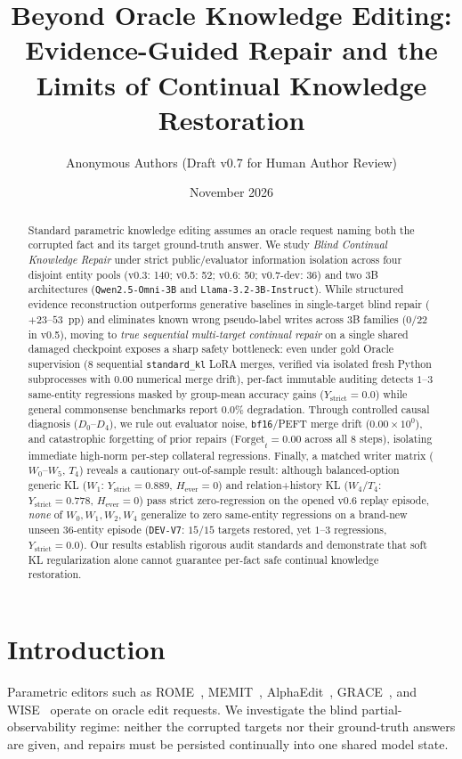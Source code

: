 \documentclass[11pt]{article}
\title{Beyond Oracle Knowledge Editing: Evidence-Guided Repair and the Limits of Continual Knowledge Restoration}
\author{Anonymous Authors (Draft v0.7 for Human Author Review)}
\date{November 2026}
\begin{document}
\maketitle

\begin{abstract}
Standard parametric knowledge editing assumes an oracle request naming both the corrupted fact and its target ground-truth answer. We study \emph{Blind Continual Knowledge Repair} under strict public/evaluator information isolation across four disjoint entity pools (v0.3: 140; v0.5: 52; v0.6: 50; v0.7-dev: 36) and two 3B architectures (\texttt{Qwen2.5-Omni-3B} and \texttt{Llama-3.2-3B-Instruct}). While structured evidence reconstruction outperforms generative baselines in single-target blind repair ($+23$--$53$~pp) and eliminates known wrong pseudo-label writes across 3B families ($0/22$ in v0.5), moving to \emph{true sequential multi-target continual repair} on a single shared damaged checkpoint exposes a sharp safety bottleneck: even under gold Oracle supervision ($8$ sequential \texttt{standard\_kl} LoRA merges, verified via isolated fresh Python subprocesses with $0.00$ numerical merge drift), per-fact immutable auditing detects $1$--$3$ same-entity regressions masked by group-mean accuracy gains ($Y_{\text{strict}} = 0.0$) while general commonsense benchmarks report $0.0\%$ degradation. Through controlled causal diagnosis ($D_0$--$D_4$), we rule out evaluator noise, \texttt{bf16}/PEFT merge drift ($0.00\times 10^0$), and catastrophic forgetting of prior repairs ($\text{Forget}_t = 0.00$ across all 8 steps), isolating immediate high-norm per-step collateral regressions. Finally, a matched writer matrix ($W_0$--$W_5$, $T_4$) reveals a cautionary out-of-sample result: although balanced-option generic KL ($W_1$: $Y_{\text{strict}}=0.889$, $H_{\text{ever}}=0$) and relation+history KL ($W_4/T_4$: $Y_{\text{strict}}=0.778$, $H_{\text{ever}}=0$) pass strict zero-regression on the opened v0.6 replay episode, \emph{none} of $W_0, W_1, W_2, W_4$ generalize to zero same-entity regressions on a brand-new unseen 36-entity episode (\texttt{DEV-V7}: $15/15$ targets restored, yet $1$--$3$ regressions, $Y_{\text{strict}}=0.0$). Our results establish rigorous audit standards and demonstrate that soft KL regularization alone cannot guarantee per-fact safe continual knowledge restoration.
\end{abstract}

\section{Introduction}
Parametric editors such as ROME~\cite{meng2022rome}, MEMIT~\cite{meng2023memit}, AlphaEdit~\cite{fang2025alphaedit}, GRACE~\cite{hartvigsen2023grace}, and WISE~\cite{wang2024wise} operate on oracle edit requests. We investigate the blind partial-observability regime: neither the corrupted targets nor their ground-truth answers are given, and repairs must be persisted continually into one shared model state.
\end{document}

